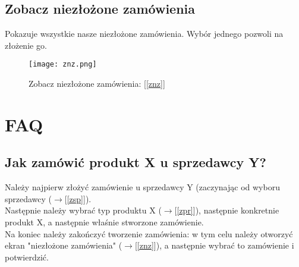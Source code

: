 \subsection{Zobacz niezłożone zamówienia}
Pokazuje wszystkie nasze niezłożone zamówienia. Wybór jednego pozwoli na złożenie go.
\label{znz}
\begin{figure}
  \centering
  \texttt{[image: znz.png]}
  \caption{Zobacz niezłożone zamówienia: [\ref{znz}]}
  \label{znzI}
\end{figure}
\section{FAQ}
\subsection{Jak zamówić produkt X u sprzedawcy Y?}
Należy najpierw złożyć zamówienie u sprzedawcy Y (zaczynając od wyboru sprzedawcy ($\rightarrow$[\ref{zsp}]).\\
Następnie należy wybrać typ produktu X ($\rightarrow$[\ref{zpr}]), następnie konkretnie produkt X, a następnie właśnie stworzone zamówienie.\\
Na koniec należy zakończyć tworzenie zamówienia: w tym celu należy otworzyć ekran "niezłożone zamówienia" ($\rightarrow$[\ref{znz}]), a następnie wybrać to zamówienie i potwierdzić.


